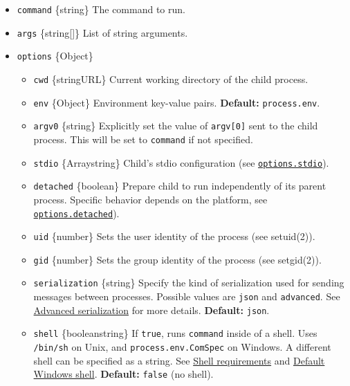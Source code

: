 \begin{itemize}
\tightlist
\item
  \texttt{command} \{string\} The command to run.
\item
  \texttt{args} \{string{[}{]}\} List of string arguments.
\item
  \texttt{options} \{Object\}

  \begin{itemize}
  \tightlist
  \item
    \texttt{cwd} \{string\textbar URL\} Current working directory of the
    child process.
  \item
    \texttt{env} \{Object\} Environment key-value pairs.
    \textbf{Default:} \texttt{process.env}.
  \item
    \texttt{argv0} \{string\} Explicitly set the value of
    \texttt{argv{[}0{]}} sent to the child process. This will be set to
    \texttt{command} if not specified.
  \item
    \texttt{stdio} \{Array\textbar string\} Child's stdio configuration
    (see \hyperref[optionsstdio]{\texttt{options.stdio}}).
  \item
    \texttt{detached} \{boolean\} Prepare child to run independently of
    its parent process. Specific behavior depends on the platform, see
    \hyperref[optionsdetached]{\texttt{options.detached}}).
  \item
    \texttt{uid} \{number\} Sets the user identity of the process (see
    setuid(2)).
  \item
    \texttt{gid} \{number\} Sets the group identity of the process (see
    setgid(2)).
  \item
    \texttt{serialization} \{string\} Specify the kind of serialization
    used for sending messages between processes. Possible values are
    \texttt{\textquotesingle{}json\textquotesingle{}} and
    \texttt{\textquotesingle{}advanced\textquotesingle{}}. See
    \hyperref[advanced-serialization]{Advanced serialization} for more
    details. \textbf{Default:}
    \texttt{\textquotesingle{}json\textquotesingle{}}.
  \item
    \texttt{shell} \{boolean\textbar string\} If \texttt{true}, runs
    \texttt{command} inside of a shell. Uses
    \texttt{\textquotesingle{}/bin/sh\textquotesingle{}} on Unix, and
    \texttt{process.env.ComSpec} on Windows. A different shell can be
    specified as a string. See \hyperref[shell-requirements]{Shell
    requirements} and \hyperref[default-windows-shell]{Default Windows
    shell}. \textbf{Default:} \texttt{false} (no shell).

\end{itemize}
\end{itemize}
